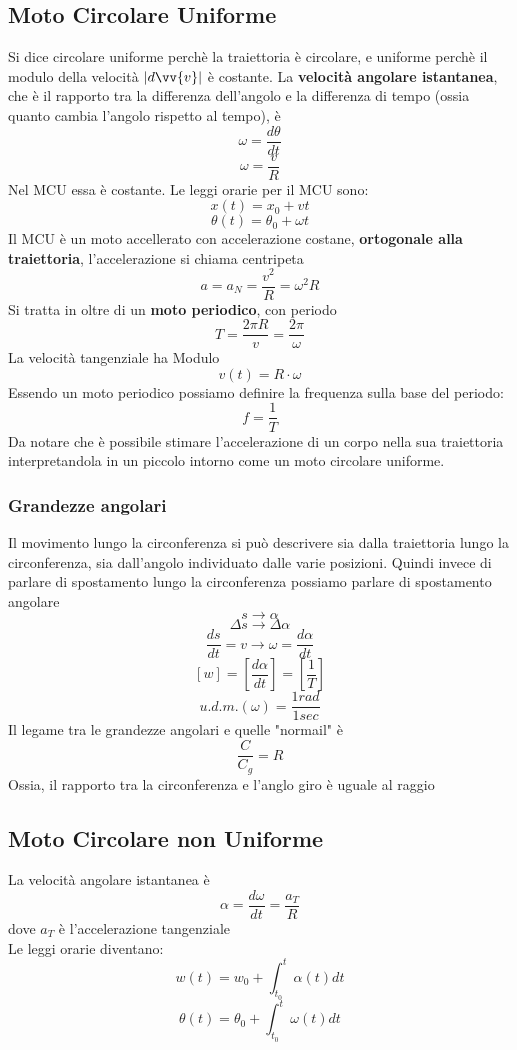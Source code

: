 \documentclass[a4paper]{report}
\begin{document}
  \subsection{Moto Circolare Uniforme}
  Si dice circolare uniforme perchè la traiettoria è circolare, e uniforme perchè il modulo della velocità $|d\vv{v}|$ è costante.
  La \textbf{velocità angolare istantanea}, che è il rapporto tra la differenza dell'angolo e la differenza di tempo (ossia quanto cambia l'angolo rispetto al tempo), è
  $$ \omega = \frac{d\theta}{dt} $$
  $$ \omega = \frac{v}{R} $$
  Nel MCU essa è costante. Le leggi orarie per il MCU sono:
  $$ x(t) =x_0 + vt$$
  $$ \theta(t) = \theta_0 + \omega t$$
  Il MCU è un moto accellerato con accelerazione costane, \textbf{ortogonale alla traiettoria}, l'accelerazione si chiama centripeta
  $$ a= a_N = \frac{v^2}{R} = \omega^2 R$$
  Si tratta in oltre di un \textbf{moto periodico}, con periodo
  $$ T=\frac{2\pi R}{v} = \frac{2\pi}{\omega} $$
  La velocità tangenziale ha Modulo
  $$ v(t) = R \cdot \omega $$
  Essendo un moto periodico possiamo definire la frequenza sulla base del periodo:
  $$ f = \frac{1}{T}$$
  Da notare che è possibile stimare l'accelerazione di un corpo nella sua traiettoria interpretandola in un piccolo intorno come un moto circolare uniforme.
  \subsubsection{Grandezze angolari}
  Il movimento lungo la circonferenza si può descrivere sia dalla traiettoria lungo la circonferenza, sia dall'angolo individuato dalle varie posizioni. Quindi invece di parlare di spostamento lungo la circonferenza possiamo parlare di spostamento angolare
  $$ s \rightarrow \alpha$$
  $$ \Delta s \rightarrow \Delta \alpha$$
  $$ \frac{ds}{dt} = v \rightarrow \omega = \frac{d\alpha}{dt}$$
  $$[w] = [\frac{d\alpha}{dt}] = [\frac{1}{T}]$$
  $$ u.d.m.(\omega) = \frac{1 rad}{1 sec}$$
  Il legame tra le grandezze angolari e quelle "normail" è
  $$\frac{C}{C_g} = R$$
  Ossia, il rapporto tra la circonferenza e l'anglo giro è uguale al raggio

  \subsection{Moto Circolare non Uniforme}
  La velocità angolare istantanea è
  $$ \alpha = \frac{d\omega}{dt} = \frac{a_T}{R} $$
  dove $a_T$ è l'accelerazione tangenziale\\
  Le leggi orarie diventano:
  $$ w(t) = w_0 + \int_{t_0}^t \alpha(t) dt $$
  $$ \theta(t) = \theta_0 + \int_{t_0}^t \omega(t) dt $$
\end{document}
